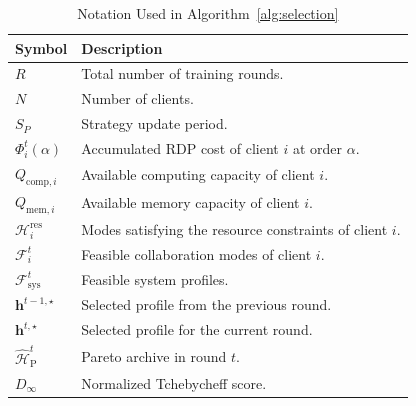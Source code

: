 \documentclass[5p,times]{elsarticle}
\theoremstyle{plain}
\theoremstyle{definition}
\theoremstyle{remark}
\begin{document}
\begin{table}[t]
\centering
\caption{Notation Used in Algorithm~\ref{alg:selection}}
\label{tab:algorithm_notation}
\small
\begin{tabular}{p{}p{}}
\hline
\textbf{Symbol} & \textbf{Description} \\
\hline
$R$ & Total number of training rounds. \\
$N$ & Number of clients. \\
$S_P$ & Strategy update period. \\
$\Phi_i^t(\alpha)$ & Accumulated RDP cost of client $i$ at order $\alpha$. \\
$Q_{\mathrm{comp},i}$ & Available computing capacity of client $i$. \\
$Q_{\mathrm{mem},i}$ & Available memory capacity of client $i$. \\
$\mathcal H_i^{\mathrm{res}}$ & Modes satisfying the resource constraints of client $i$. \\
$\mathcal F_i^t$ & Feasible collaboration modes of client $i$. \\
$\mathcal F_{\mathrm{sys}}^t$ & Feasible system profiles. \\
$\mathbf h^{t-1,\star}$ & Selected profile from the previous round. \\
$\mathbf h^{t,\star}$ & Selected profile for the current round. \\
$\widehat{\mathcal H}_{\mathrm P}^t$ & Pareto archive in round $t$. \\
$D_\infty$ & Normalized Tchebycheff score. \\
\hline
\end{tabular}
\end{table}
\end{document}
